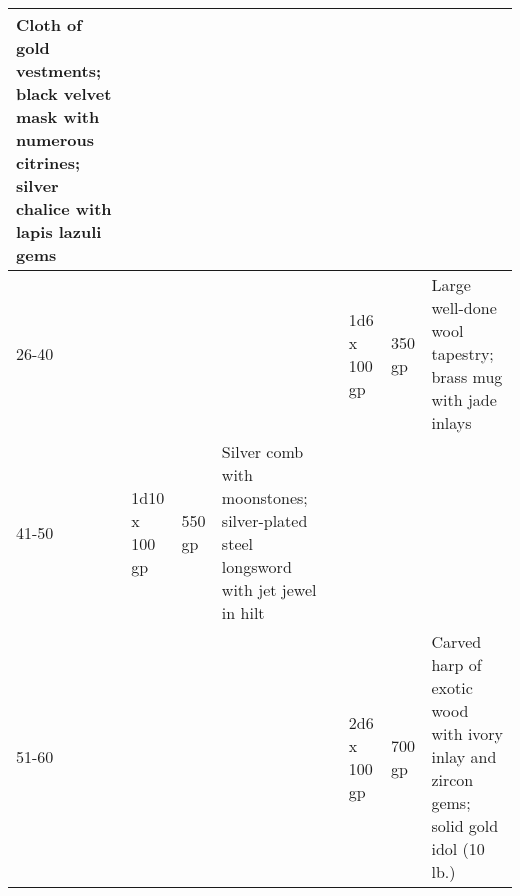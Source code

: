 \begin{longtable}{llllllll}
{\begin{minipage}[t]{0.450in}
Cloth of gold vestments; black velvet mask with numerous citrines; silver chalice 
with lapis lazuli gems\end{minipage}}\\
\hline
\multicolumn{5}{p{3.040in}|}{\begin{minipage}[t]{3.040in}\raggedright
26-40\end{minipage}} & \multicolumn{1}{p{0.043in}|}{\begin{minipage}[t]{0.043in}\raggedright
1d6 x 100 gp\end{minipage}} & \multicolumn{1}{p{0.043in}|}{\begin{minipage}[t]{0.043in}\raggedright
350 gp\end{minipage}} & \multicolumn{1}{p{0.043in}|}{\begin{minipage}[t]{0.043in}\raggedright
Large well-done wool tapestry; brass mug with jade inlays\end{minipage}}\\
\hline
\multicolumn{1}{p{0.043in}|}{\begin{minipage}[t]{0.043in}\raggedright
41-50\end{minipage}} & \multicolumn{1}{|p{0.349in}|}{\begin{minipage}[t]{0.349in}\raggedright
1d10 x 100 gp\end{minipage}} & \multicolumn{1}{p{0.661in}|}{\begin{minipage}[t]{0.661in}\raggedright
550 gp\end{minipage}} & \multicolumn{1}{p{0.450in}|}{\begin{minipage}[t]{0.450in}\raggedright
Silver comb with moonstones; silver-plated steel longsword with jet jewel in hilt\end{minipage}}\\
\hline
\multicolumn{5}{p{3.040in}|}{\begin{minipage}[t]{3.040in}\raggedright
51-60\end{minipage}} & \multicolumn{1}{|p{0.349in}|}{\begin{minipage}[t]{0.349in}\raggedright
2d6 x 100 gp\end{minipage}} & \multicolumn{1}{p{0.661in}|}{\begin{minipage}[t]{0.661in}\raggedright
700 gp\end{minipage}} & \multicolumn{1}{p{0.450in}|}{\begin{minipage}[t]{0.450in}\raggedright
Carved harp of exotic wood with ivory inlay and zircon gems; solid gold idol (10 
lb.)\end{minipage}}\\

\end{longtable}
